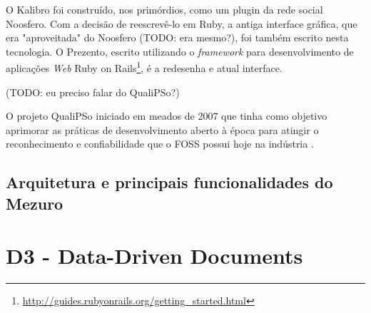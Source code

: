 
O Kalibro foi construído, nos primórdios, como um plugin da rede social
Noosfero. Com a decisão de reescrevê-lo em Ruby, a antiga interface gráfica,
que era "aproveitada" do Noosfero (TODO: era mesmo?), foi também escrito nesta
tecnologia. O Prezento, escrito utilizando o \textit{framework} para
desenvolvimento de aplicações \textit{Web} Ruby on Rails\footnote{\url{http://guides.rubyonrails.org/getting_started.html}},
é a redesenha e atual interface.


(TODO: eu preciso falar do QualiPSo?)

O projeto QualiPSo iniciado em meados de 2007 que tinha como objetivo aprimorar
as práticas de desenvolvimento aberto à época para atingir o reconhecimento e
confiabilidade que o FOSS possui hoje na indústria \cite{messias2012}. 

\subsection{Arquitetura e principais funcionalidades do Mezuro}

\section{D3 - Data-Driven Documents}

